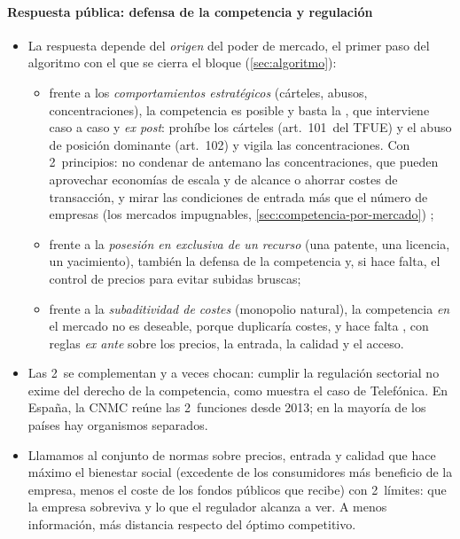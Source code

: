 \documentclass[11pt]{article}
\begin{document}
\paragraph{Respuesta pública: defensa de la competencia y regulación}

\begin{itemize}
\item La respuesta depende del \emph{origen} del poder de mercado, el primer paso del algoritmo con el que se cierra el bloque (\ref{sec:algoritmo}):
  \begin{itemize}
  \item frente a los \emph{comportamientos estratégicos} (cárteles, abusos, concentraciones), la competencia es posible y basta la , que interviene caso a caso y \emph{ex post}: prohíbe los cárteles (art.~101~del TFUE) y el abuso de posición dominante (art.~102) y vigila las concentraciones\nocite{UE2016TFUE,UE2004Reglamento139}. Con 2~principios: no condenar de antemano las concentraciones, que pueden aprovechar economías de escala y de alcance o ahorrar costes de transacción, y mirar las condiciones de entrada más que el número de empresas (los mercados impugnables, \ref{sec:competencia-por-mercado}) ;
  \item frente a la \emph{posesión en exclusiva de un recurso} (una patente, una licencia, un yacimiento), también la defensa de la competencia y, si hace falta, el control de precios para evitar subidas bruscas;
  \item frente a la \emph{subaditividad de costes} (monopolio natural), la competencia \emph{en} el mercado no es deseable, porque duplicaría costes, y hace falta , con reglas \emph{ex ante} sobre los precios, la entrada, la calidad y el acceso.
  \end{itemize}
\item Las 2~se complementan y a veces chocan: cumplir la regulación sectorial no exime del derecho de la competencia, como muestra el caso de Telefónica. En España, la CNMC reúne las 2~funciones desde 2013\nocite{Ley3_2013CNMC}; en la mayoría de los países hay organismos separados.
\item Llamamos  al conjunto de normas sobre precios, entrada y calidad que hace máximo el bienestar social (excedente de los consumidores más beneficio de la empresa, menos el coste de los fondos públicos que recibe) con 2~límites: que la empresa sobreviva y lo que el regulador alcanza a ver. A menos información, más distancia respecto del óptimo competitivo.
\end{itemize}
\end{document}
